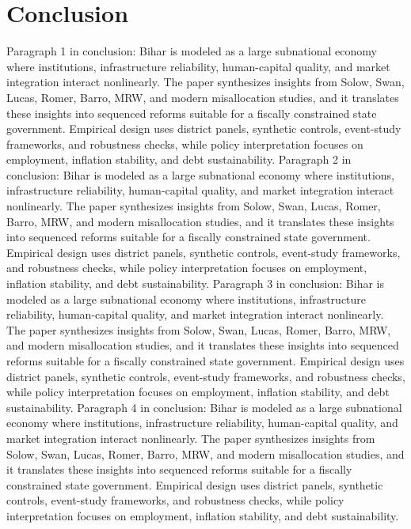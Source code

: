 \documentclass[preprint,12pt]{elsarticle}
\begin{document}
\section{Conclusion}
Paragraph 1 in conclusion: Bihar is modeled as a large subnational economy where institutions, infrastructure reliability, human-capital quality, and market integration interact nonlinearly. The paper synthesizes insights from Solow, Swan, Lucas, Romer, Barro, MRW, and modern misallocation studies, and it translates these insights into sequenced reforms suitable for a fiscally constrained state government. Empirical design uses district panels, synthetic controls, event-study frameworks, and robustness checks, while policy interpretation focuses on employment, inflation stability, and debt sustainability.
Paragraph 2 in conclusion: Bihar is modeled as a large subnational economy where institutions, infrastructure reliability, human-capital quality, and market integration interact nonlinearly. The paper synthesizes insights from Solow, Swan, Lucas, Romer, Barro, MRW, and modern misallocation studies, and it translates these insights into sequenced reforms suitable for a fiscally constrained state government. Empirical design uses district panels, synthetic controls, event-study frameworks, and robustness checks, while policy interpretation focuses on employment, inflation stability, and debt sustainability.
Paragraph 3 in conclusion: Bihar is modeled as a large subnational economy where institutions, infrastructure reliability, human-capital quality, and market integration interact nonlinearly. The paper synthesizes insights from Solow, Swan, Lucas, Romer, Barro, MRW, and modern misallocation studies, and it translates these insights into sequenced reforms suitable for a fiscally constrained state government. Empirical design uses district panels, synthetic controls, event-study frameworks, and robustness checks, while policy interpretation focuses on employment, inflation stability, and debt sustainability.
Paragraph 4 in conclusion: Bihar is modeled as a large subnational economy where institutions, infrastructure reliability, human-capital quality, and market integration interact nonlinearly. The paper synthesizes insights from Solow, Swan, Lucas, Romer, Barro, MRW, and modern misallocation studies, and it translates these insights into sequenced reforms suitable for a fiscally constrained state government. Empirical design uses district panels, synthetic controls, event-study frameworks, and robustness checks, while policy interpretation focuses on employment, inflation stability, and debt sustainability.
\end{document}
